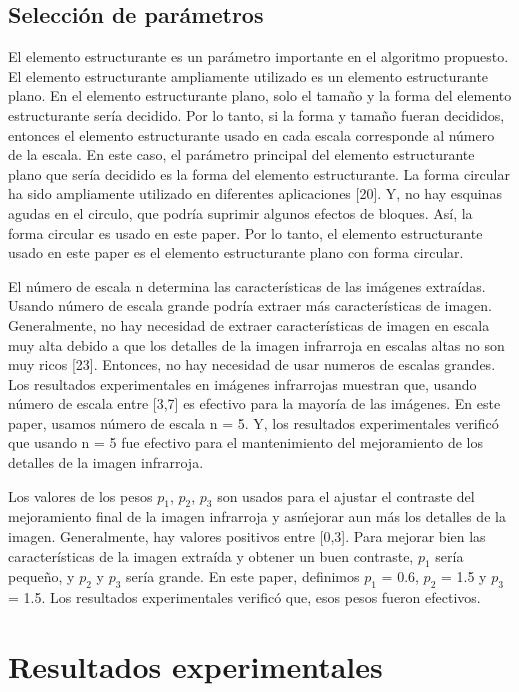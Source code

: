 \documentclass[a4paper, 11 pt, conference]{ieeeconf}      %
\begin{document}
\subsection{Selecci\'on de par\'ametros}

El elemento estructurante es un par\'ametro importante en el algoritmo propuesto.
El elemento estructurante ampliamente utilizado es un elemento estructurante plano. En el elemento estructurante plano, solo el tamaño y la forma del elemento estructurante ser\'ia decidido. Por lo tanto, si la forma y tamaño fueran decididos, entonces el elemento estructurante usado en cada escala corresponde al n\'umero de la escala.  En este caso, el par\'ametro principal del elemento estructurante plano que ser\'ia decidido es la forma del elemento estructurante. La forma circular ha sido ampliamente utilizado en diferentes aplicaciones [20]. Y, no hay esquinas agudas en el circulo, que podr\'ia suprimir algunos efectos de bloques. As\'i, la forma circular es usado en este paper. Por lo tanto, el elemento estructurante usado en este paper es el elemento estructurante plano con forma circular.

El n\'umero de escala n determina las caracter\'isticas de las im\'agenes extra\'idas. Usando n\'umero de escala grande podr\'ia extraer m\'as caracter\'isticas de imagen. Generalmente, no hay necesidad de extraer caracter\'isticas de imagen en escala muy alta debido a que los detalles de la imagen infrarroja en escalas altas no son muy ricos [23]. Entonces, no hay necesidad de usar numeros de escalas grandes. Los resultados experimentales en im\'agenes infrarrojas muestran que, usando n\'umero de escala entre [3,7] es efectivo para la mayor\'ia de las im\'agenes. En este paper, usamos n\'umero de escala n = 5. Y, los resultados experimentales verific\'o que usando n = 5 fue efectivo para el mantenimiento del mejoramiento de los detalles de la imagen infrarroja.

Los valores de los pesos $p_1$, $p_2$, $p_3$ son usados para el ajustar el contraste del mejoramiento final de la imagen infrarroja y as\' mejorar aun m\'as los detalles de la imagen. Generalmente, hay valores positivos entre [0,3]. Para mejorar bien las caracter\'isticas de la imagen extra\'ida y obtener un buen contraste, $p_1$ ser\'ia pequeño, y $p_2$ y $p_3$ ser\'ia grande. En este paper, definimos $p_1$ = 0.6, $p_2$ = 1.5 y $p_3$ = 1.5. Los resultados experimentales verific\'o que, esos pesos fueron efectivos.

\section{Resultados experimentales}
\end{document}
